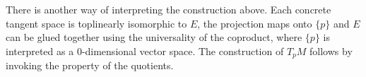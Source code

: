 \documentclass[../main-manifolds.tex]{subfiles}
\begin{document}
\begin{definition}
    
\end{definition}
\begin{note}
    There is another way of interpreting the construction above. Each concrete tangent space is toplinearly isomorphic to $E$, the projection maps onto $\{p\}$ and $E$ can be glued together using the universality of the coproduct, where $\{p\}$ is interpreted as a $0$-dimensional vector space. The construction of $T_pM$ follows by invoking the property of the quotients.
\end{note}
\end{document}
